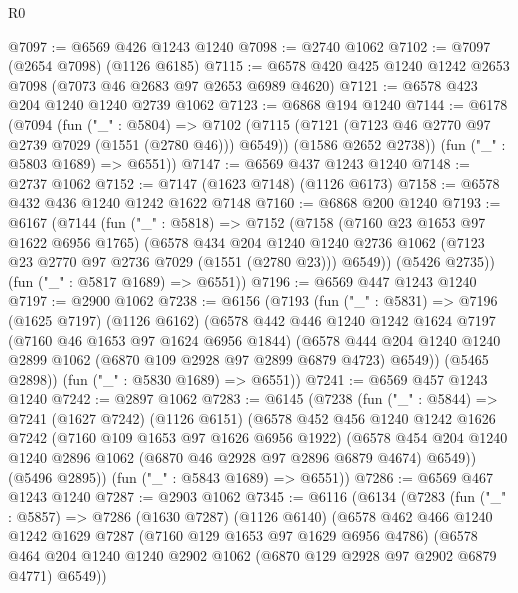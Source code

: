 \begin{lexlean}{R0}
\begin{coremodule}
@7097 := @6569 @426 @1243 @1240
@7098 := @2740 @1062
@7102 := @7097 (@2654 @7098) (@1126 @6185)
@7115 := @6578 @420 @425 @1240 @1242 @2653 @7098 (@7073 @46 @2683 @97 @2653 @6989 @4620)
@7121 := @6578 @423 @204 @1240 @1240 @2739 @1062
@7123 := @6868 @194 @1240
@7144 := @6178
    (@7094
      (fun ("_" : @5804) =>
      @7102
        (@7115 (@7121 (@7123 @46 @2770 @97 @2739 @7029 (@1551 (@2780 @46))) @6549))
        (@1586 @2652 @2738))
      (fun ("_" : @5803 @1689) => @6551))
@7147 := @6569 @437 @1243 @1240
@7148 := @2737 @1062
@7152 := @7147 (@1623 @7148) (@1126 @6173)
@7158 := @6578 @432 @436 @1240 @1242 @1622 @7148
@7160 := @6868 @200 @1240
@7193 := @6167
    (@7144
      (fun ("_" : @5818) =>
      @7152
        (@7158
          (@7160 @23 @1653 @97 @1622 @6956 @1765)
          (@6578
            @434
            @204
            @1240
            @1240
            @2736
            @1062
            (@7123 @23 @2770 @97 @2736 @7029 (@1551 (@2780 @23)))
            @6549))
        (@5426 @2735))
      (fun ("_" : @5817 @1689) => @6551))
@7196 := @6569 @447 @1243 @1240
@7197 := @2900 @1062
@7238 := @6156
    (@7193
      (fun ("_" : @5831) =>
      @7196
        (@1625 @7197)
        (@1126 @6162)
        (@6578
          @442
          @446
          @1240
          @1242
          @1624
          @7197
          (@7160 @46 @1653 @97 @1624 @6956 @1844)
          (@6578 @444 @204 @1240 @1240 @2899 @1062 (@6870 @109 @2928 @97 @2899 @6879 @4723) @6549))
        (@5465 @2898))
      (fun ("_" : @5830 @1689) => @6551))
@7241 := @6569 @457 @1243 @1240
@7242 := @2897 @1062
@7283 := @6145
    (@7238
      (fun ("_" : @5844) =>
      @7241
        (@1627 @7242)
        (@1126 @6151)
        (@6578
          @452
          @456
          @1240
          @1242
          @1626
          @7242
          (@7160 @109 @1653 @97 @1626 @6956 @1922)
          (@6578 @454 @204 @1240 @1240 @2896 @1062 (@6870 @46 @2928 @97 @2896 @6879 @4674) @6549))
        (@5496 @2895))
      (fun ("_" : @5843 @1689) => @6551))
@7286 := @6569 @467 @1243 @1240
@7287 := @2903 @1062
@7345 := @6116
    (@6134
      (@7283
        (fun ("_" : @5857) =>
        @7286
          (@1630 @7287)
          (@1126 @6140)
          (@6578
            @462
            @466
            @1240
            @1242
            @1629
            @7287
            (@7160 @129 @1653 @97 @1629 @6956 @4786)
            (@6578
              @464
              @204
              @1240
              @1240
              @2902
              @1062
              (@6870 @129 @2928 @97 @2902 @6879 @4771)
              @6549))

\end{coremodule}
\end{lexlean}

